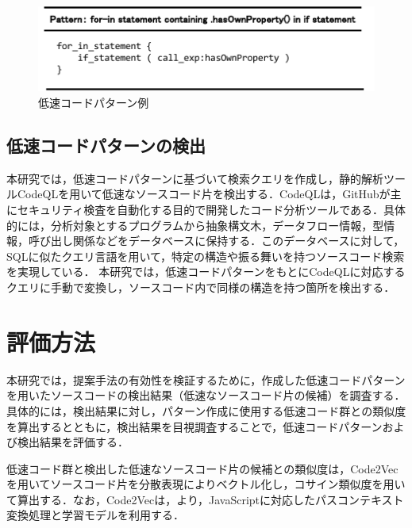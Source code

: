 \documentclass[submit,techrep,noauthor]{ipsj}
\newcommand{\todo}[1]{\colorbox{yellow}{{\bf TODO}:}{\color{red} {\textbf{[#1]}}}}
\begin{document}
\begin{figure}[!h]
    \centering
    \includegraphics[width=1.0\linewidth]{./Noguchi_fig/slow_pattern.pdf}
    \caption{低速コードパターン例}
    \label{fig:slow_pattern}
\end{figure}



\subsection{低速コードパターンの検出}

本研究では，低速コードパターンに基づいて検索クエリを作成し，静的解析ツールCodeQL\cite{ql}を用いて低速なソースコード片を検出する．CodeQLは，GitHubが主にセキュリティ検査を自動化する目的で開発したコード分析ツールである．具体的には，分析対象とするプログラムから抽象構文木，データフロー情報，型情報，呼び出し関係などをデータベースに保持する．このデータベースに対して，SQLに似たクエリ言語を用いて，特定の構造や振る舞いを持つソースコード検索を実現している．
本研究では，低速コードパターンをもとにCodeQLに対応するクエリに手動で変換し，ソースコード内で同様の構造を持つ箇所を検出する．


\section{評価方法}
\label{sec:evaluation}

本研究では，提案手法の有効性を検証するために，作成した低速コードパターンを用いたソースコードの検出結果（低速なソースコード片の候補）を調査する．具体的には，検出結果に対し，パターン作成に使用する低速コード群との類似度を算出するとともに，検出結果を目視調査することで，低速コードパターンおよび検出結果を評価する．

低速コード群と検出した低速なソースコード片の候補との類似度は，Code2Vec\cite{code2vec}を用いてソースコード片を分散表現によりベクトル化し，コサイン類似度を用いて算出する．なお，Code2Vecは，\cite{saiki}より，JavaScriptに対応したパスコンテキスト変換処理と学習モデルを利用する．

\end{document}
